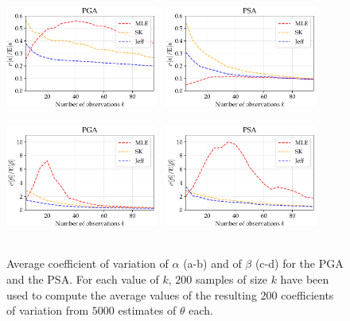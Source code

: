     \begin{figure}[!h]
        \centering
        {\includegraphics[width=5cm]{figures/uncIM/coeff_alpha_PGA.pdf}}\ %
        {\includegraphics[width=5cm]{figures/uncIM/coeff_alpha_PSA.pdf}} \\
        \ \\
        {\includegraphics[width=5cm]{figures/uncIM/coeff_beta_PGA.pdf}}\ %
         {\includegraphics[width=5cm]{figures/uncIM/coeff_beta_PSA.pdf}}\\
         \ \\[-8pt]
         \caption{Average coefficient of variation of $\alpha$ (a-b) and of $\beta$ (c-d) for the PGA and the PSA. For each value of $k$, $200$ samples of size $k$ have been used to compute the average values of the resulting $200$ coefficients of variation from $5000$ estimates of $\theta$ each.}
           \label{uncIM:fig:ASG_CoV}
    \end{figure}


